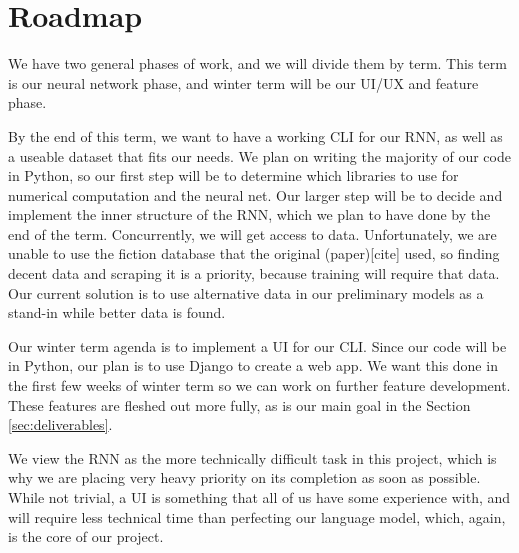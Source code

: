 \section{Roadmap}\label{sec:roadmap}
We have two general phases of work, and we will divide them by term. This term is our neural network phase, and winter term will be our UI/UX and feature phase.

By the end of this term, we want to have a working CLI for our RNN, as well as a useable dataset that fits our needs. We plan on writing the majority of our code in Python, so our first step will be to determine which libraries to use for numerical computation and the neural net. Our larger step will be to decide and implement the inner structure of the RNN,  which we plan to have done by the end of the term. Concurrently, we will get access to data. Unfortunately, we are unable to use the fiction database that the original (paper)[cite] used, so finding decent data and scraping it is a priority, because training will require that data. Our current solution is to use alternative data in our preliminary models as a stand-in while better data is found.

Our winter term agenda is to implement a UI for our CLI. Since our code will be in Python, our plan is to use Django to create a web app. We want this done in the first few weeks of winter term so we can work on further feature development. These features are fleshed out more fully, as is our main goal in the Section \ref{sec:deliverables}.

We view the RNN as the more technically difficult task in this project, which is why we are placing very heavy priority on its completion as soon as possible. While not trivial, a UI is something that all of us have some experience with, and will require less technical time than perfecting our language model, which, again, is the core of our project.
